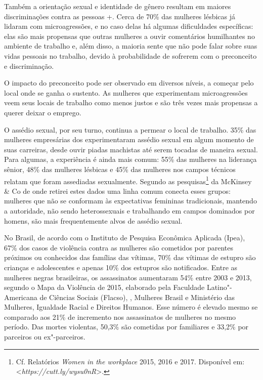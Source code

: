Também a orientação sexual e identidade de gênero resultam em maiores
discriminações contra as pessoas +. Cerca de 70\% das mulheres
lésbicas já lidaram com microagressões, e no caso delas há algumas
dificuldades específicas: elas são mais propensas que outras mulheres a
ouvir comentários humilhantes no ambiente de trabalho e, além disso, a
maioria sente que não pode falar sobre suas vidas pessoais no trabalho,
devido à probabilidade de sofrerem com o preconceito e discriminação.

O impacto do preconceito pode ser observado em diversos níveis, a
começar pelo local onde se ganha o sustento. As mulheres que
experimentam microagressões veem seus locais de trabalho como menos
justos e são três vezes mais propensas a querer deixar o emprego.

O assédio sexual, por seu turno, continua a permear o local de trabalho.
35\% das mulheres empresárias dos  experimentaram assédio sexual em
algum momento de suas carreiras, desde ouvir piadas machistas até serem
tocadas de maneira sexual. Para algumas, a experiência é ainda mais
comum: 55\% das mulheres na liderança sênior, 48\% das mulheres lésbicas
e 45\% das mulheres nos campos técnicos relatam que foram assediadas
sexualmente. Segundo as pesquisas\footnote{Cf. Relatórios \emph{Women in
  the workplace} 2015, 2016 e 2017. Disponível em:
  \textless{}\emph{https://cutt.ly/wysu0nR}\textgreater{}.} da McKinsey \& Co de onde
retirei estes dados uma linha comum conecta esses grupos: mulheres que
não se conformam às expectativas femininas tradicionais, mantendo a
autoridade, não sendo heterossexuais e trabalhando em campos dominados
por homens, são mais frequentemente alvos de assédio sexual.

No Brasil, de acordo com o Instituto de Pesquisa Econômica Aplicada
(Ipea), 67\% dos casos de violência contra as mulheres são cometidos por
parentes próximos ou conhecidos das famílias das vítimas, 70\% das
vítimas de estupro são crianças e adolescentes e apenas 10\% dos
estupros são notificados. Entre as mulheres negras brasileiras, os
assassinatos aumentaram 54\% entre 2003 e 2013, segundo o Mapa da
Violência de 2015, elaborado pela Faculdade Latino"-Americana de Ciências
Sociais (Flacso), ,  Mulheres Brasil e Ministério das Mulheres,
Igualdade Racial e Direitos Humanos. Esse número é elevado mesmo se
comparado aos 21\% de incremento nos assassinatos de mulheres no mesmo
período. Das mortes violentas, 50,3\% são cometidas por familiares e
33,2\% por parceiros ou ex"-parceiros.

